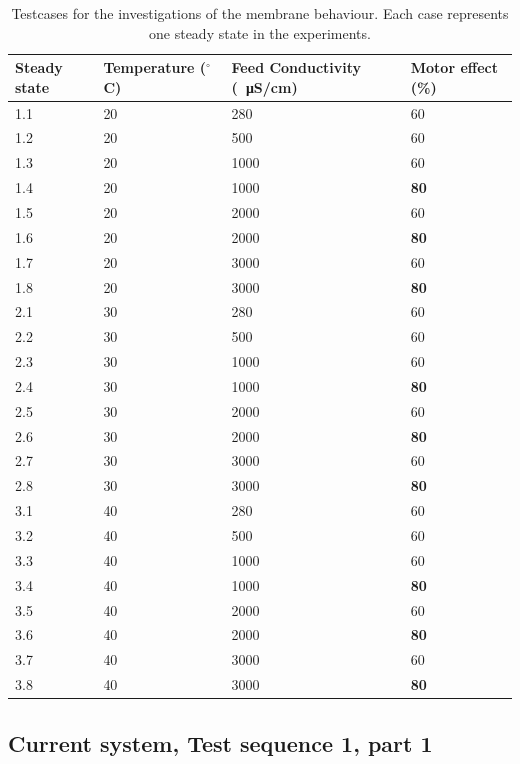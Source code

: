 \begin{table}[H]
\centering
\begin{tabular}{|p{1.4cm}||p{2cm}|p{3.2cm}|p{1.8cm}|}
 \hline
 \textbf{Steady state }&Temperature  ($^{\circ}$C)&Feed Conductivity (\SI{}{\micro\siemens}/cm)&Motor effect (\%) \\
 \hline
 1.1 & 20 & 280  & 60 \\
 1.2 & 20 & 500  & 60 \\
 1.3 & 20 & 1000 & 60  \\
 1.4 & 20 & 1000 & \textbf{80} \\
 1.5 & 20 & 2000 & 60 \\
 1.6 & 20 & 2000 & \textbf{80}\\
 1.7 & 20 & 3000 & 60 \\
 1.8 & 20 & 3000 & \textbf{80}\\
 \hline
 2.1 & 30 & 280 & 60 \\
 2.2 & 30 & 500 & 60 \\
 2.3 & 30 & 1000 & 60 \\
 2.4 & 30 & 1000 & \textbf{80}\\
 2.5 & 30 & 2000 & 60 \\
 2.6 & 30 & 2000 & \textbf{80}\\
 2.7 & 30 & 3000 & 60 \\
 2.8 & 30 & 3000 & \textbf{80}\\
 \hline 
 3.1 & 40 & 280 & 60 \\
 3.2 & 40 & 500 & 60 \\
 3.3 & 40 & 1000 & 60 \\
 3.4 & 40 & 1000 & \textbf{80}\\
 3.5 & 40 & 2000 & 60 \\
 3.6 & 40 & 2000 & \textbf{80}\\
 3.7 & 40 & 3000 & 60 \\
 3.8 & 40 & 3000 & \textbf{80}\\
\hline
\end{tabular}
\caption{Testcases for the investigations of the membrane behaviour. Each case represents one steady state in the experiments.}
    \label{tab:test cases} 
\end{table}


\newpage

\subsection{Current system, Test sequence 1, part 1}

